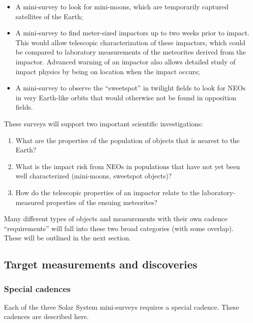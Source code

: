 \begin{itemize}
\item A mini-survey to look for mini-moons, which are temporarily captured
satellites of the Earth;
\item A mini-survey to find meter-sized impactors up to two weeks prior to impact.
This would allow telescopic characterization of these impactors, which could
be compared to laboratory measurements of the meteorites derived from
the impactor. Advanced warning of an impactor also allows detailed
study of impact physics by being on location when the impact
occurs;
\item A mini-survey to observe the ``sweetspot'' in twilight fields
to look for NEOs in very Earth-like orbits that would otherwise not
be found in opposition fields.
\end{itemize}

These surveys will support two important scientific investigations:
\begin{enumerate}
\item What are the properties of the population of objects that is
nearest to the Earth?
\item What is the impact risk from NEOs in populations that
have not yet been well characterized (mini-moons, sweetspot objects)?
\item How do the telescopic properties of an impactor relate to the
laboratory-measured properties of the ensuing meteorites?
\end{enumerate}

Many different types of objects and measurements with their own cadence
``requirements'' will fall into these two broad categories (with some
overlap).  These will be outlined in the next section.


\subsection{Target measurements and discoveries}
\label{sec:\secname:targets}

\subsubsection{Special cadences}

Each of the three Solar System mini-surveys requires a special
cadence. These cadences are described here.

